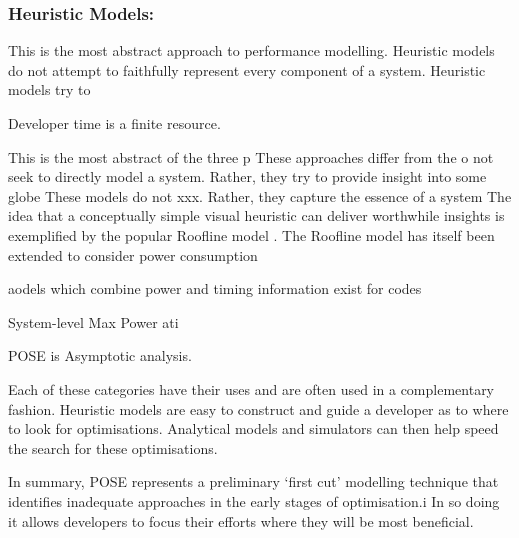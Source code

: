 \subsubsection{Heuristic Models:}
This is the most abstract approach to performance modelling.
Heuristic models do not attempt to faithfully represent every component of a system.
Heuristic models try to


Developer time is a finite resource.

This is the most abstract of the three p
These approaches differ from the o not seek to directly model a system.
Rather, they try to provide insight into some globe
These models do not xxx. Rather, they  capture the essence of a system 
The idea that a conceptually simple visual heuristic can deliver worthwhile insights is exemplified by the popular Roofline model \cite{williams:2009aa}. The Roofline model has itself been extended to consider power consumption \cite{choi:2013aa} 


aodels which combine power and timing information exist for codes 

System-level Max Power ati

POSE is Asymptotic analysis.



%
%


Each of these categories have their uses and are often used in a complementary fashion.
Heuristic models are easy to construct and guide a developer as to where to look for optimisations.
Analytical models and simulators can then help speed the search for these optimisations.

In summary, POSE represents a preliminary `first cut' modelling technique that identifies inadequate approaches in the early stages of optimisation.i
In so doing it allows developers to focus their efforts where they will be most beneficial. 
